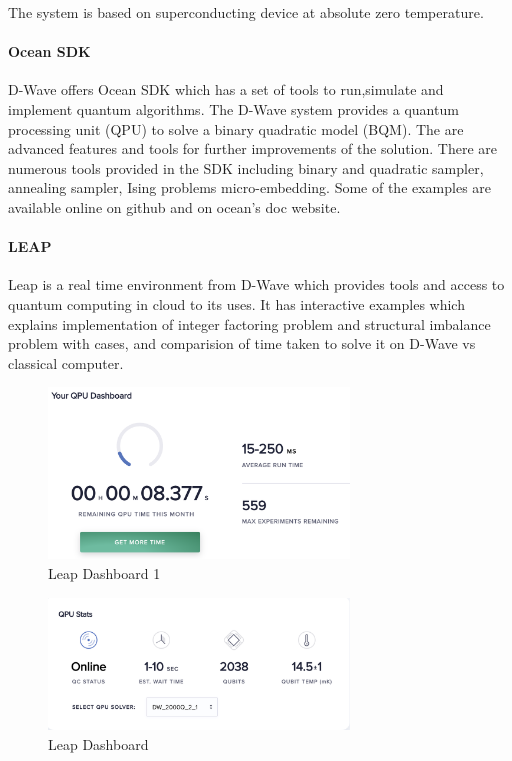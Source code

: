 \documentclass[12pt,conference]{IEEEtran}
\begin{document}
The system is based on superconducting device at absolute zero temperature.

\paragraph{Ocean SDK} D-Wave offers Ocean SDK which has a set of tools to run,simulate and implement quantum algorithms. The D-Wave system provides a quantum processing unit (QPU) to solve a binary quadratic model (BQM). The are advanced features and tools for further improvements of the solution. There are numerous tools provided in the SDK including binary and quadratic sampler, annealing sampler, Ising problems micro-embedding. Some of the examples are available online on github and on ocean's doc website. 

\paragraph{LEAP} Leap is a real time environment from D-Wave which provides tools and access to quantum computing in cloud to its uses. It has interactive examples which explains implementation of integer factoring problem and structural imbalance problem with cases, and comparision of time taken to solve it on D-Wave vs classical computer.

\begin{figure}[h]
  \centering
  \includegraphics[width=8cm]{Leap-db1.png}
  \caption{Leap Dashboard 1}
  \label{fig:LDB}
\end{figure}

\begin{figure}[H]
  \centering
  \includegraphics[width=8cm]{Leap-db2.png}
  \caption{Leap Dashboard}
  \label{fig:LDB2}
\end{figure}
\end{document}
